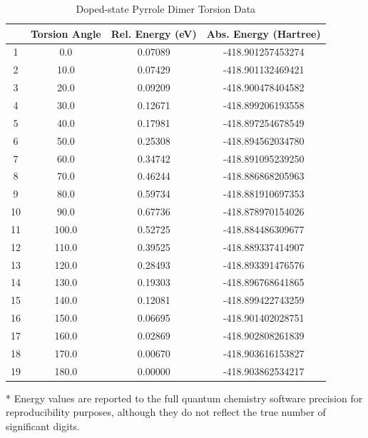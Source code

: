 \begin{table}[hbt!]\centering
\caption{Doped-state Pyrrole Dimer Torsion Data}
\renewcommand{\arraystretch}{1.5}
\begin{threeparttable}
\begin{tabular}{cccc}\toprule
  {} & {Torsion Angle} & {Rel. Energy (eV)} & {Abs. Energy (Hartree)} \\ \midrule
    1  & 0.0   & 0.07089 & -418.901257453274\\
    2  & 10.0  & 0.07429 & -418.901132469421\\
    3  & 20.0  & 0.09209 & -418.900478404582\\
    4  & 30.0  & 0.12671 & -418.899206193558\\
    5  & 40.0  & 0.17981 & -418.897254678549\\
    6  & 50.0  & 0.25308 & -418.894562034780\\
    7  & 60.0  & 0.34742 & -418.891095239250\\
    8  & 70.0  & 0.46244 & -418.886868205963\\
    9  & 80.0  & 0.59734 & -418.881910697353\\
    10 & 90.0  & 0.67736 & -418.878970154026\\
    11 & 100.0 & 0.52725 & -418.884486309677\\
    12 & 110.0 & 0.39525 & -418.889337414907\\
    13 & 120.0 & 0.28493 & -418.893391476576\\
    14 & 130.0 & 0.19303 & -418.896768641865\\
    15 & 140.0 & 0.12081 & -418.899422743259\\
    16 & 150.0 & 0.06695 & -418.901402028751\\
    17 & 160.0 & 0.02869 & -418.902808261839\\
    18 & 170.0 & 0.00670 & -418.903616153827\\
    19 & 180.0 & 0.00000 & -418.903862534217\\ \bottomrule
\end{tabular}
\begin{tablenotes}
\item[*] \footnotesize Energy values are reported to the full quantum chemistry software precision for reproducibility purposes, although they do not reflect the true number of significant digits.
\end{tablenotes}
\end{threeparttable}
\end{table}

